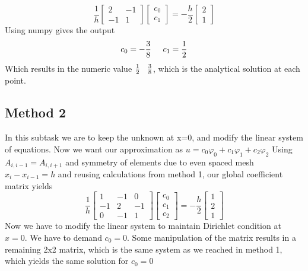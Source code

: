 \documentclass[a4paper,norsk]{article}
\begin{document}
\[ \frac{1}{h}
\begin{bmatrix}
2 & -1 \\ -1 & 1
\end{bmatrix}
\begin{bmatrix}
c_0\\ c_1
\end{bmatrix}
= -\frac{h}{2}
\begin{bmatrix}
2\\1 
\end{bmatrix}
\]
Using numpy gives the output
\begin{align}
c_0 = -\frac{3}{8} \hspace{5mm} c_1 = \frac{1}{2}
\end{align}
Which results in the numeric value $\frac{1}{2}\hspace{3mm} \frac{3}{8}$, which is the analytical solution at each point.

\subsection*{Method 2}
In this subtask we are to keep the unknown at x=0, and modify the linear system of equations. Now we want our approximation as $u = c_0 \varphi_0 + c_1 \varphi_1 + c_2 \varphi_2$ Using  $A_{i,i-1} = A_{i,i+1}$ and symmetry of elements due to even spaced mesh $x_i-x_{i-1} = h$ and reusing calculations from method 1, our global coefficient matrix yields 
\[ \frac{1}{h}
\begin{bmatrix}
1 & -1 & 0 \\
-1 & 2 & -1 \\
0 & -1 & 1
\end{bmatrix}
\begin{bmatrix}
c_0\\ c_1 \\ c_2
\end{bmatrix}
= -\frac{h}{2}
\begin{bmatrix}
1 \\ 2 \\ 1 
\end{bmatrix}
\]
Now we have to modify the linear system to maintain Dirichlet condition at $x=0$. We have to demand $c_0 = 0$. Some manipulation of the matrix results in a remaining 2x2 matrix, which is the same system as we reached in method 1, which yields the same solution for $c_0 = 0$
\end{document}
